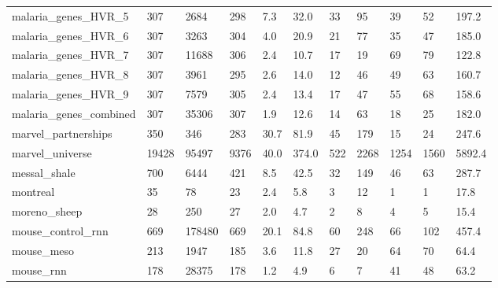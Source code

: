 \begin{longtable}{lllllllllll}
 malaria\_genes\_HVR\_5                                & 307        & 2684      & 298   & 7.3    & 32.0   & 33    & 95     & 39     & 52     & 197.2   \\
 malaria\_genes\_HVR\_6                                & 307        & 3263      & 304   & 4.0    & 20.9   & 21    & 77     & 35     & 47     & 185.0   \\
 malaria\_genes\_HVR\_7                                & 307        & 11688     & 306   & 2.4    & 10.7   & 17    & 19     & 69     & 79     & 122.8   \\
 malaria\_genes\_HVR\_8                                & 307        & 3961      & 295   & 2.6    & 14.0   & 12    & 46     & 49     & 63     & 160.7   \\
 malaria\_genes\_HVR\_9                                & 307        & 7579      & 305   & 2.4    & 13.4   & 17    & 47     & 55     & 68     & 158.6   \\
 malaria\_genes\_combined                             & 307        & 35306     & 307   & 1.9    & 12.6   & 14    & 63     & 18     & 25     & 182.0   \\
 marvel\_partnerships                                & 350        & 346       & 283   & 30.7   & 81.9   & 45    & 179    & 15     & 24     & 247.6   \\
 marvel\_universe                                    & 19428      & 95497     & 9376  & 40.0   & 374.0  & 522   & 2268   & 1254   & 1560   & 5892.4  \\
 messal\_shale                                       & 700        & 6444      & 421   & 8.5    & 42.5   & 32    & 149    & 46     & 63     & 287.7   \\
 montreal                                           & 35         & 78        & 23    & 2.4    & 5.8    & 3     & 12     & 1      & 1      & 17.8    \\
 moreno\_sheep                                       & 28         & 250       & 27    & 2.0    & 4.7    & 2     & 8      & 4      & 5      & 15.4    \\
 mouse\_control\_rnn                                  & 669        & 178480    & 669   & 20.1   & 84.8   & 60    & 248    & 66     & 102    & 457.4   \\
 mouse\_meso                                         & 213        & 1947      & 185   & 3.6    & 11.8   & 27    & 20     & 64     & 70     & 64.4    \\
 mouse\_rnn                                          & 178        & 28375     & 178   & 1.2    & 4.9    & 6     & 7      & 41     & 48     & 63.2    \\

\end{longtable}
